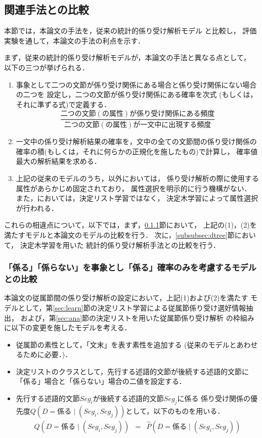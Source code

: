 \subsection{関連手法との比較}
\label{subsec:compare}

本節では，本論文の手法を，従来の統計的係り受け解析モデル
\cite{Collins96a,Fujio97aj,Ehara98aj,Haruno98cj,Uchimoto98aj}と比較し，
評価実験を通して，本論文の手法の利点を示す．

まず，従来の統計的係り受け解析モデルが，本論文の手法と異なる点として，
以下の三つが挙げられる．
\begin{enumerate}
  \item[(1)] 事象として二つの文節が係り受け関係にある場合と係り受け関係にない場合の二つを
   	設定し，二つの文節が係り受け関係にある確率を次式
	(もしくは，それに準ずる式)で定義する．
	\[
	\frac{二つの文節(の属性)が係り受け関係にある頻度}{二つの文節(の属性)が一文中に出現する頻度}
	\]
  \item[(2)] 一文中の係り受け解析結果の確率を，文中の全ての文節間の係り受け関係の
	確率の積(もしくは，それに何らかの正規化を施したもの)で計算し，
	確率値最大の解析結果を求める．
  \item[(3)] 上記の従来のモデルのうち，\cite{Haruno98cj}以外においては，
	係り受け解析の際に使用する属性があらかじめ固定されており，
	属性選択を明示的に行う機構がない．
	また，\cite{Haruno98cj}においては，決定リスト学習ではなく，
	決定木学習\cite{Quinlan93a}によって属性選択が行われる．
\end{enumerate}
これらの相違点について，以下では，まず，\ref{subsubsec:prev_dep}節において，
上記の(1)，(2)を満たすモデル\mbox{と本論文のモデル}の比較を行う．
次に，\ref{subsubsec:dtree}節において，
決定木学習\cite{Quinlan93a}を用いた\break
統計的係り受け解析手法\cite{Haruno98cj}との比較を行う．

\subsubsection{「係る」「係らない」を事象とし「係る」確率のみを考慮するモデルとの比較}
\label{subsubsec:prev_dep}





本論文の従属節間の係り受け解析の設定において，上記(1)および(2)を満たす
モデルとして，第\ref{sec:learn}節の決定リスト学習による従属節係り受け選好情報抽出，
および，第\ref{sec:ana}\mbox{節の決定リスト}を用いた従属節係り受け解析
の枠組みに以下の変更を施したモデルを考える．
\begin{itemize}
  \item 従属節の素性として，「文末」を表す素性を追加する
	(従来のモデルとあわせるために必要．)．
  \item 決定リストのクラスとして，先行する述語的文節が後続する述語的文節に
	「係る」場合と「係らない」場合の二値を設定する．
  \item 先行する述語的文節$Seg_i$が後続する述語的文節$Seg_j$に係る
	係り受け関係の優先度$Q(D\!=\!係る\mid (Seg_i,Seg_j))$として，以下のものを用いる．
	\begin{eqnarray*}
	Q(D\!=\!係る\mid (Seg_i,Seg_j)) & = & \hat{P}(D\!=\!係る\mid (Seg_i,Seg_j))
	\end{eqnarray*}
\end{itemize}

